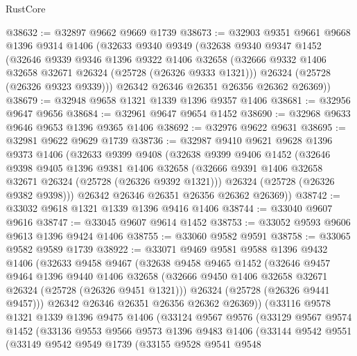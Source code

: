 \begin{lexlean}{RustCore}
\begin{coremodule}
@38632 := @32897 @9662 @9669 @1739
@38673 := @32903
    @9351
    @9661
    @9668
    @1396
    @9314
    @1406
    (@32633
      @9340
      @9349
      (@32638
        @9340
        @9347
        @1452
        (@32646
          @9339
          @9346
          @1396
          @9322
          @1406
          @32658
          (@32666 @9332 @1406 @32658 @32671 @26324 (@25728 (@26326 @9333 @1321)))
          @26324
          (@25728 (@26326 @9323 @9339)))
        @26342
        @26346
        @26351
        @26356
        @26362
        @26369))
@38679 := @32948 @9658 @1321 @1339 @1396 @9357 @1406
@38681 := @32956 @9647 @9656
@38684 := @32961 @9647 @9654 @1452
@38690 := @32968 @9633 @9646 @9653 @1396 @9365 @1406
@38692 := @32976 @9622 @9631
@38695 := @32981 @9622 @9629 @1739
@38736 := @32987
    @9410
    @9621
    @9628
    @1396
    @9373
    @1406
    (@32633
      @9399
      @9408
      (@32638
        @9399
        @9406
        @1452
        (@32646
          @9398
          @9405
          @1396
          @9381
          @1406
          @32658
          (@32666 @9391 @1406 @32658 @32671 @26324 (@25728 (@26326 @9392 @1321)))
          @26324
          (@25728 (@26326 @9382 @9398)))
        @26342
        @26346
        @26351
        @26356
        @26362
        @26369))
@38742 := @33032 @9618 @1321 @1339 @1396 @9416 @1406
@38744 := @33040 @9607 @9616
@38747 := @33045 @9607 @9614 @1452
@38753 := @33052 @9593 @9606 @9613 @1396 @9424 @1406
@38755 := @33060 @9582 @9591
@38758 := @33065 @9582 @9589 @1739
@38922 := @33071
    @9469
    @9581
    @9588
    @1396
    @9432
    @1406
    (@32633
      @9458
      @9467
      (@32638
        @9458
        @9465
        @1452
        (@32646
          @9457
          @9464
          @1396
          @9440
          @1406
          @32658
          (@32666 @9450 @1406 @32658 @32671 @26324 (@25728 (@26326 @9451 @1321)))
          @26324
          (@25728 (@26326 @9441 @9457)))
        @26342
        @26346
        @26351
        @26356
        @26362
        @26369))
    (@33116
      @9578
      @1321
      @1339
      @1396
      @9475
      @1406
      (@33124
        @9567
        @9576
        (@33129
          @9567
          @9574
          @1452
          (@33136
            @9553
            @9566
            @9573
            @1396
            @9483
            @1406
            (@33144
              @9542
              @9551
              (@33149
                @9542
                @9549
                @1739
                (@33155
                  @9528
                  @9541
                  @9548

\end{coremodule}
\end{lexlean}
